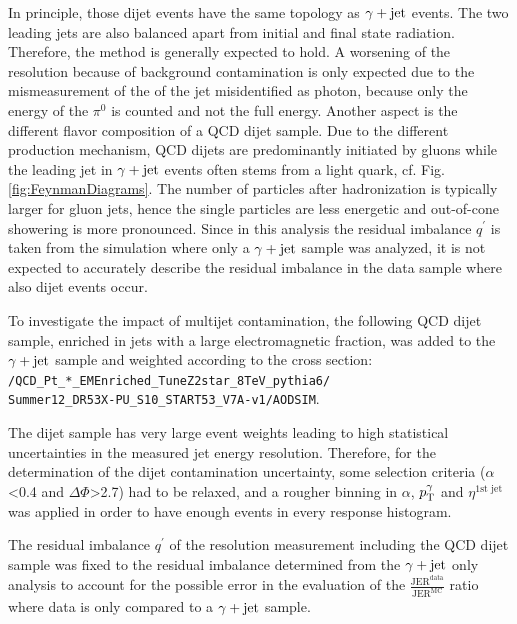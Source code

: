 In principle, those dijet events have the same topology as $\gamma + \text{jet}$ events. The two leading jets are also balanced apart from initial and final state radiation. 
Therefore, the method is generally expected to hold. 
A worsening of the resolution because of background contamination is only expected due to the mismeasurement of the \pt of the jet misidentified as photon,
because only the energy of the $\pi^0$ is counted and not the full energy.
Another aspect is the different flavor composition of a QCD dijet sample. 
Due to the different production mechanism, QCD dijets are predominantly initiated by gluons 
while the leading jet in $\gamma + \text{jet}$ events often stems from a light quark, cf. Fig.\ref{fig:FeynmanDiagrams}.
The number of particles after hadronization is typically larger for gluon jets, hence the single particles are less energetic and out-of-cone showering is more pronounced.
Since in this analysis the residual imbalance $q^{\prime}$ is taken from the simulation where only a $\gamma + \text{jet}$ sample was analyzed, 
it is not expected to accurately describe the residual imbalance in the data sample where also dijet events occur.

To investigate the impact of multijet contamination, the following QCD dijet sample, enriched in jets with a large electromagnetic fraction, 
was added to the $\gamma + \text{jet}$ sample and weighted according to the cross section:\\
\texttt{/QCD\_Pt\_*\_EMEnriched\_TuneZ2star\_8TeV\_pythia6/}\\
\texttt{Summer12\_DR53X-PU\_S10\_START53\_V7A-v1/AODSIM}.

The dijet sample has very large event weights leading to high statistical uncertainties in the measured jet energy resolution. 
Therefore, for the determination of the dijet contamination uncertainty, some selection criteria ($\alpha$<0.4 and $\Delta\Phi$>2.7) had to be relaxed, 
and a rougher binning in $\alpha$, $p_{\text{T}}^{\gamma}$ and $\eta^{\text{1st jet}}$ was applied in order to have enough events in every response histogram. 

The residual imbalance $q^{\prime}$ of the resolution measurement including the QCD dijet sample was fixed to the residual imbalance determined from the $\gamma + \text{jet}$ only analysis to account for the possible error 
in the evaluation of the $\frac{\text{JER}^{\text{data}}}{\text{JER}^{\text{MC}}}$ ratio where data is only compared to a $\gamma + \text{jet}$ sample.

